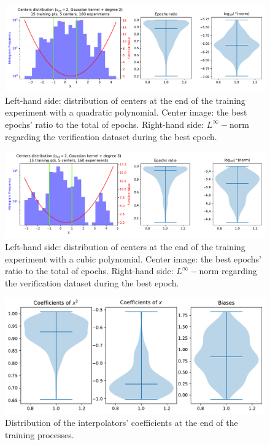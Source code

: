 \documentclass[12pt]{report} %
\begin{document}
\begin{figure}[ht]
  \includegraphics[width=\textwidth]{imagenes/experiments/1d/ode/tr15_c5_gaussian_kernel_deg2.pdf}
  \caption{Left-hand side: distribution of centers at the end of the training experiment
    with a quadratic polynomial. Center
    image: the best epochs' ratio to the total of epochs. Right-hand side: $L^\infty-$norm regarding
    the verification dataset during the best epoch.}
  \label{fig:tr15-c5-gaussian-kernel-quadratic-ode-1d}
\end{figure}

\begin{figure}[ht]
  \includegraphics[width=\textwidth]{imagenes/experiments/1d/ode/tr15_c5_gaussian_kernel_deg3.pdf}
  \caption{Left-hand side: distribution of centers at the end of the training experiment
    with a cubic polynomial. Center
    image: the best epochs' ratio to the total of epochs. Right-hand side: $L^\infty-$norm regarding
    the verification dataset during the best epoch.}
  \label{fig:tr15-c5-gaussian-kernel-cubic-ode-1d}
\end{figure}

\begin{figure}[h]
  \includegraphics[width=.85\textwidth]{imagenes/experiments/1d/ode/approximation_of_actual_solution}
  \caption{Distribution of the interpolators' coefficients at the end of the training processes.}
  \label{fig:tr15-c5-quadratic-ode-1d-coefs}
\end{figure}
\end{document}
